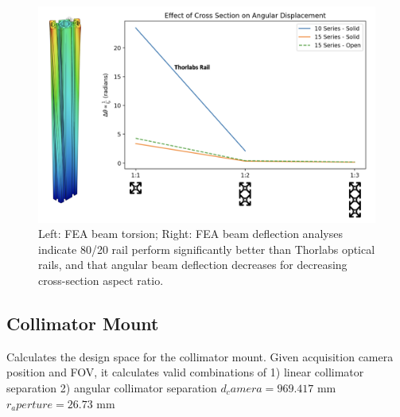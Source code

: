 %
\begin{figure}
    \centering
    \includegraphics[width=0.75\linewidth]{figures/beam_torsion.png}
    \caption{Left: FEA beam torsion; Right: FEA beam deflection analyses indicate 80/20 rail perform significantly better than Thorlabs optical rails, and that angular beam deflection decreases for decreasing cross-section aspect ratio.}
    \label{fig:beam_torsion}
\end{figure}

\subsection{Collimator Mount}
Calculates the design space for the collimator mount.
Given acquisition camera position and FOV, it calculates valid combinations of 
    1) linear collimator separation
    2) angular collimator separation
$d_camera = 969.417$ mm
$r_aperture = 26.73$ mm

